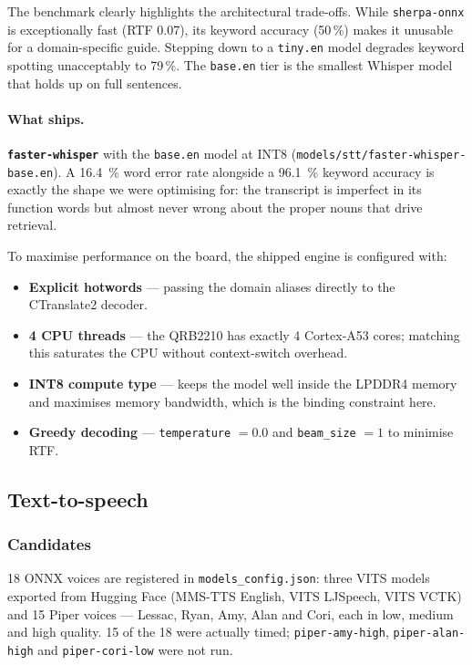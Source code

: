 \documentclass[11pt,a4paper]{article}
\begin{document}
The benchmark clearly highlights the architectural trade-offs. While \texttt{sherpa-onnx} is exceptionally fast (RTF 0.07), its keyword accuracy (50\,\%) makes it unusable for a domain-specific guide. Stepping down to a \texttt{tiny.en} model degrades keyword spotting unacceptably to 79\,\%. The \texttt{base.en} tier is the smallest Whisper model that holds up on full sentences. 

\paragraph{What ships.} \textbf{\texttt{faster-whisper}} with the \texttt{base.en} model at INT8 (\texttt{models/stt/faster-whisper-base.en}). A \SI{16.4}{\percent} word error rate alongside a \SI{96.1}{\percent} keyword accuracy is exactly the shape we were optimising for: the transcript is imperfect in its function words but almost never wrong about the proper nouns that drive retrieval. 

To maximise performance on the board, the shipped engine is configured with:
\begin{itemize}
  \item \textbf{Explicit hotwords} --- passing the domain aliases directly to the CTranslate2 decoder.
  \item \textbf{4 CPU threads} --- the QRB2210 has exactly 4 Cortex-A53 cores; matching this saturates the CPU without context-switch overhead.
  \item \textbf{INT8 compute type} --- keeps the model well inside the LPDDR4 memory and maximises memory bandwidth, which is the binding constraint here.
  \item \textbf{Greedy decoding} --- \texttt{temperature} $=0.0$ and \texttt{beam\_size} $=1$ to minimise RTF.
\end{itemize}
\subsection{Text-to-speech}

\subsubsection{Candidates}

18 ONNX voices are registered in \texttt{models\_config.json}: three VITS
models exported from Hugging Face (MMS-TTS English, VITS LJSpeech, VITS VCTK)
and 15 Piper voices --- Lessac, Ryan, Amy, Alan and Cori, each in low, medium
and high quality. 15 of the 18 were actually timed;
\texttt{piper-amy-high}, \texttt{piper-alan-high} and \texttt{piper-cori-low}
were not run.
\end{document}

